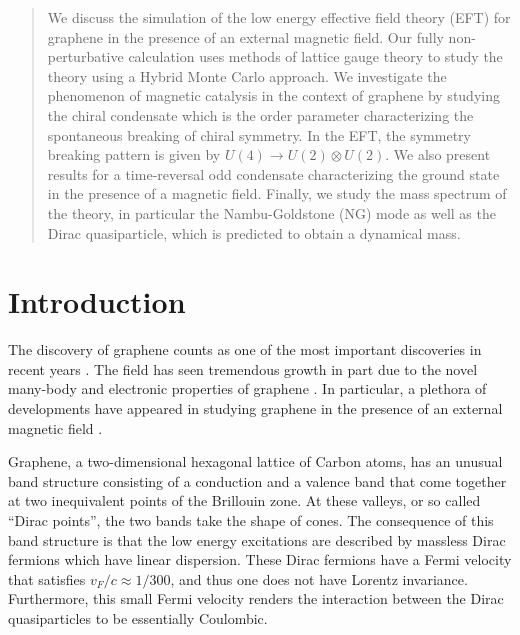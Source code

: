 \documentclass[aps,prd,twocolumn,showpacs,superscriptaddress,groupedaddress]{revtex4}  %
\begin{document}
\begin{abstract}
We discuss the simulation of the low energy effective field theory (EFT) for graphene in the presence of an external magnetic field. Our fully non-perturbative calculation 
uses methods of lattice gauge theory to study the theory using a Hybrid Monte Carlo approach. We investigate the phenomenon of magnetic catalysis in the context of graphene by studying
the chiral condensate which is the order parameter characterizing the spontaneous breaking of chiral symmetry. In the EFT, the symmetry breaking pattern is given by $U(4) \to U(2) \otimes U(2)$. We also present results for a time-reversal odd condensate characterizing the ground state in the presence of a magnetic field.
Finally, we study the mass spectrum of the theory, in particular the Nambu-Goldstone (NG) mode as well as the Dirac quasiparticle, which is predicted to obtain a dynamical mass. 
\end{abstract}

\maketitle

\section{\label{sec:Intro}Introduction}
The discovery of graphene counts as one of the most important discoveries in recent years \cite{Novoselov}. The field has seen tremendous growth
in part due to the novel many-body and electronic properties of graphene \cite{CastroNeto}. In particular, a plethora of developments have appeared in studying graphene
in the presence of an external magnetic field \cite{Goerbig}.

Graphene, a two-dimensional hexagonal lattice of Carbon atoms, has an unusual band structure consisting of a conduction and a valence band that come together at two inequivalent points 
of the Brillouin zone. At these valleys, or so called ``Dirac points'', the two bands take the shape of cones. The consequence of this band structure is that the low energy excitations are described by massless Dirac fermions which have linear dispersion.
These Dirac fermions have a Fermi velocity that satisfies $v_F/c \approx 1/300$, and thus one does not have Lorentz invariance. Furthermore, this small Fermi velocity renders the interaction between the Dirac quasiparticles 
to be essentially Coulombic.
\end{document}
